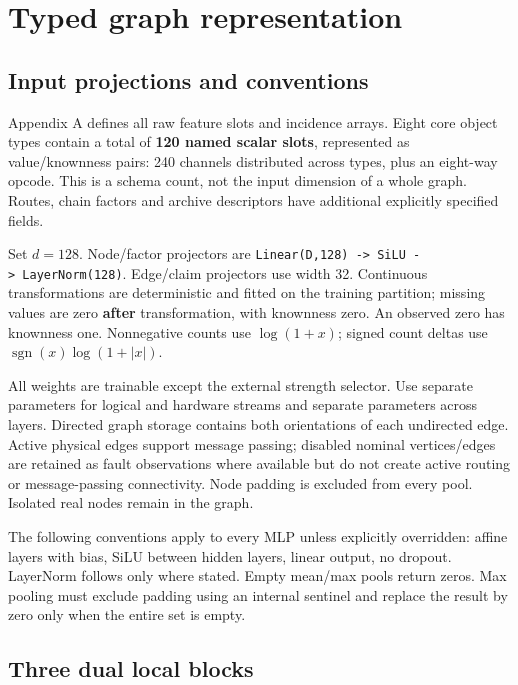 \documentclass[10pt,a4paper]{article}
\begin{document}
\hypertarget{typed-graph-representation}{%
\section{Typed graph representation}\label{typed-graph-representation}}

\hypertarget{input-projections-and-conventions}{%
\subsection{Input projections and
conventions}\label{input-projections-and-conventions}}

Appendix A defines all raw feature slots and incidence arrays. Eight
core object types contain a total of \textbf{120 named scalar slots},
represented as value/knownness pairs: 240 channels distributed across
types, plus an eight-way opcode. This is a schema count, not the input
dimension of a whole graph. Routes, chain factors and archive
descriptors have additional explicitly specified fields.

Set \(d=128\). Node/factor projectors are
\texttt{Linear(D,128)\ -\textgreater{}\ SiLU\ -\textgreater{}\ LayerNorm(128)}.
Edge/claim projectors use width 32. Continuous transformations are
deterministic and fitted on the training partition; missing values are
zero \textbf{after} transformation, with knownness zero. An observed
zero has knownness one. Nonnegative counts use \(\log(1+x)\); signed
count deltas use \(\operatorname{sgn}(x)\log(1+|x|)\).

All weights are trainable except the external strength selector. Use
separate parameters for logical and hardware streams and separate
parameters across layers. Directed graph storage contains both
orientations of each undirected edge. Active physical edges support
message passing; disabled nominal vertices/edges are retained as fault
observations where available but do not create active routing or
message-passing connectivity. Node padding is excluded from every pool.
Isolated real nodes remain in the graph.

The following conventions apply to every MLP unless explicitly
overridden: affine layers with bias, SiLU between hidden layers, linear
output, no dropout. LayerNorm follows only where stated. Empty mean/max
pools return zeros. Max pooling must exclude padding using an internal
sentinel and replace the result by zero only when the entire set is
empty.

\hypertarget{three-dual-local-blocks}{%
\subsection{Three dual local blocks}\label{three-dual-local-blocks}}
\end{document}
